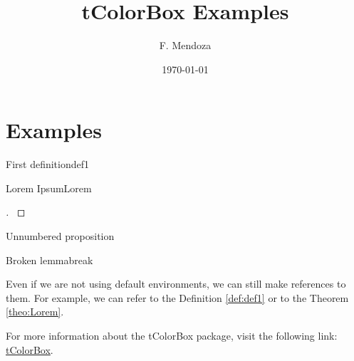 \documentclass[a4paper,11pt, titlepage]{article}
\title{\bf{tColorBox Examples}}
\author{F. Mendoza}
\date{\today}
\newenvironment{Proof}[1][\proofname]{%
\begin{proof}[#1]$ $\par\nobreak\ignorespaces
    }{%
\end{proof}
}
\begin{document}
\maketitle

\section{Examples}

\begin{Definition}{First definition}{def1}  %
	\lipsum[1]
\end{Definition}


\begin{Theorem}{Lorem Ipsum}{Lorem}
	\lipsum[2]
\end{Theorem}

\begin{Proof}
	\lipsum[3]
\end{Proof}

\begin{Corollary*}{}{}  %
	\lipsum[4]
\end{Corollary*}

\begin{Proposition*}{Unnumbered proposition} %
	\lipsum[5]
\end{Proposition*}

\begin{Lemma}{Broken lemma}{break}
	\lipsum[6-7]
\end{Lemma}

\begin{Example}{}{}
	\lipsum[8]
\end{Example}

Even if we are not using default environments, we can still make references to them. 
For example, we can refer to the Definition \ref{def:def1} or to the Theorem \ref{theo:Lorem}. 

For more information about the tColorBox package, visit the following link: \href{https://ctan.org/pkg/tcolorbox}{tColorBox}.
\end{document}
